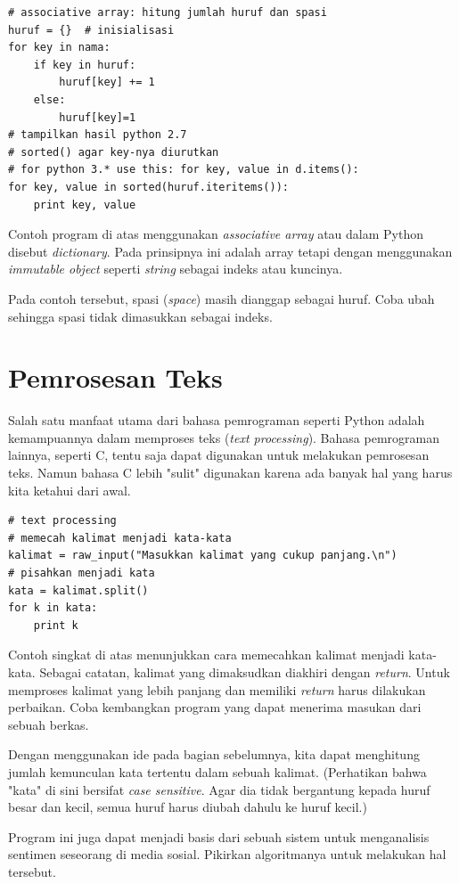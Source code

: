 \begin{verbatim}
# associative array: hitung jumlah huruf dan spasi
huruf = {}  # inisialisasi
for key in nama:
    if key in huruf:
        huruf[key] += 1
    else:
        huruf[key]=1
# tampilkan hasil python 2.7
# sorted() agar key-nya diurutkan
# for python 3.* use this: for key, value in d.items():
for key, value in sorted(huruf.iteritems()):
    print key, value
\end{verbatim}

Contoh program di atas menggunakan {\em associative array} atau dalam
Python disebut {\em dictionary}. Pada prinsipnya ini adalah array tetapi
dengan menggunakan {\em immutable object} seperti {\em string} sebagai
indeks atau kuncinya.

Pada contoh tersebut, spasi ({\em space}) masih dianggap sebagai huruf.
Coba ubah sehingga spasi tidak dimasukkan sebagai indeks.


\section{Pemrosesan Teks}
Salah satu manfaat utama dari bahasa pemrograman seperti Python adalah
kemampuannya dalam memproses teks ({\em text processing}). Bahasa
pemrograman lainnya, seperti C, tentu saja dapat digunakan untuk melakukan
pemrosesan teks. Namun bahasa C lebih "sulit" digunakan karena ada banyak
hal yang harus kita ketahui dari awal.

\begin{verbatim}
# text processing
# memecah kalimat menjadi kata-kata
kalimat = raw_input("Masukkan kalimat yang cukup panjang.\n")
# pisahkan menjadi kata
kata = kalimat.split()
for k in kata:
    print k
\end{verbatim}

Contoh singkat di atas menunjukkan cara memecahkan kalimat menjadi kata-kata.
Sebagai catatan, kalimat yang dimaksudkan diakhiri dengan {\em return}. 
Untuk memproses kalimat yang lebih panjang dan memiliki {\em return} harus 
dilakukan perbaikan.
Coba kembangkan program yang dapat menerima masukan dari sebuah berkas.

Dengan menggunakan ide pada bagian sebelumnya, kita dapat menghitung
jumlah kemunculan kata tertentu dalam sebuah kalimat. (Perhatikan bahwa
"kata" di sini bersifat {\em case sensitive}. Agar dia tidak bergantung
kepada huruf besar dan kecil, semua huruf harus diubah dahulu ke
huruf kecil.)

Program ini juga dapat menjadi basis dari sebuah sistem untuk menganalisis
sentimen seseorang di media sosial. Pikirkan algoritmanya untuk melakukan
hal tersebut.


